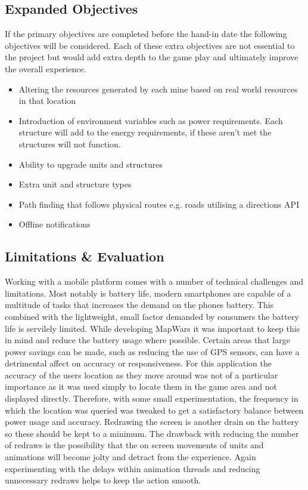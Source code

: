 \subsection{Expanded Objectives}
If the primary objectives are completed before the hand-in date the following objectives will be considered. Each of these extra objectives are not essential to the project but would add extra depth to the game play and ultimately improve the overall experience.
\begin{itemize}
\item Altering the resources generated by each mine based on real world resources in that location
\item Introduction of environment variables such as power requirements. Each structure will add to the energy requirements, if these aren't met the structures will not function.
\item Ability to upgrade units and structures
\item Extra unit and structure types
\item Path finding that follows physical routes e.g. roads utilising a directions API
\item Offline notifications
\end{itemize}


\subsection{Limitations \& Evaluation}
Working with a mobile platform comes with a number of technical challenges and limitations. Most notably is battery life, modern smartphones are capable of a multitude of tasks that increases the demand on the phones battery. This combined with the lightweight, small factor demanded by consumers the battery life is servilely limited. While developing MapWars it was important to keep this in mind and reduce the battery usage where possible. Certain areas that large power savings can be made, such as reducing the use of GPS sensors, can have a detrimental affect on accuracy or responsiveness. For this application the accuracy of the users location as they move around was not of a particular importance as it was used simply to locate them in the game area and not displayed directly. Therefore, with some small experimentation, the frequency in which the location was queried was tweaked to get a satisfactory balance between power usage and accuracy. Redrawing the screen is another drain on the battery so these should be kept to a minimum. The drawback with reducing the number of redraws is the possibility that the on screen movements of units and animations will become jolty and detract from the experience. Again experimenting with the delays within animation threads and reducing unnecessary redraws helps to keep the action smooth.

